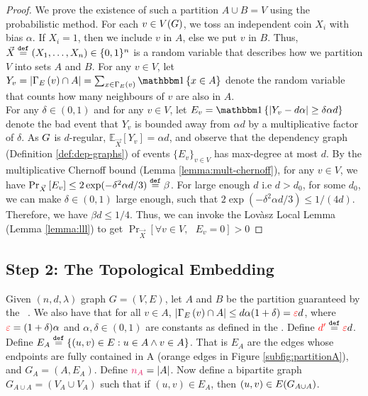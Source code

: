 \documentclass[11pt]{article}
\newcommand{\EnDeeLambda}{(n, d, \lambda)}
\newcommand{\na}{\textcolor{razzmatazz}{n_A}}
\newcommand{\BipartiteG}{G_{A \cup A}}
\newcommand{\EdgesShort}{E}
\newcommand{\Mean}[2]{\mathbb{E}_{#1}\left[#2\right]}
\newcommand{\PProb}[2]{\Pr_{#2}\left[#1 \right]}
\newcommand{\dApproxLower}{\textcolor{red}{d'}}
\begin{document}
\begin{proof}We prove the existence of such a partition $A \cup B = V$ using the probabilistic method.
For each $v \in V(G)$, we toss an independent coin $X_i$ with bias $\alpha$.
If $X_i = 1$, then we include $v$ in $A$, else we put $v$ in $B$.
Thus, $\vec{X} \text{}\overset{\mathtt{def}}{=} (X_1, \dots, X_n) \in \{0,1\}^n$ is a random variable that describes how we partition $V$ into sets $A$ and $B$.
For any $v \in V$, let $Y_v = |\Neighbourhood{\EdgesShort}{v} \cap A| = \sum_{x \in \Neighbourhood{E}{v}} \Indicator{x \in A}$ denote the random variable that counts how many neighbours of $v$ are also in $A$.\\
For any $\delta \in (0,1)$ and for any $v \in V$, let $E_v = \Indicator{|Y_v - d\alpha | \geq \delta \alpha d}$ denote the bad event that $Y_v$ is bounded away from $\alpha d$ by a multiplicative factor of $\delta$.
As $G$ is $d$-regular, $\Mean{\vec{X}}{Y_v} = \alpha d$, and observe that the dependency graph (Definition \ref{def:dep-graphs}) of events $\{ E_v \}_{v \in V}$ has max-degree at most $d$.
By the multiplicative Chernoff bound (Lemma \ref{lemma:mult-chernoff}), for any $v \in V$, we have $\PProb{E_v}{\vec{X}} \leq 2\exp(-\delta^2\alpha d/3) \Def \beta$.
For large enough $d$ i.e $d > d_0$, for some $d_0$, we can make $\delta \in (0,1)$ large enough, such that $2\exp(-\delta^2\alpha d/3) \leq 1/(4d)$. Therefore, we have $\beta d \leq 1/4$.
Thus, we can invoke the Lov\`asz Local Lemma (Lemma \ref{lemma:lll}) to get $\PProb{\forall v \in V, \text{ } E_v = 0}{\vec{X}} > 0$

\end{proof}



\subsection{Step 2: The Topological Embedding}

Given $\EnDeeLambda$ graph $G=(V,E)$, let $A$ and $B$ be the partition guaranteed by the \ .
We also have that for all $v \in A$,  $|\Neighbourhood{\EdgesShort}{v} \cap A| \leq d \alpha(1+\delta) = \Eps d$, where $\textcolor{red}{\varepsilon} = (1+ \delta)\alpha$ and $\alpha, \delta \in (0,1)$ are constants as defined in the .
Define $\dApproxLower \Def \Eps d$.
Define $E_A \text{}\overset{\mathtt{def}}{=} \{ (u,v) \in E : u \in A \land v \in A\}$. 
That is $E_A$ are the edges whose endpoints are fully contained in A (orange edges in Figure \ref{subfig:partitionA}), and $G_A = (A, E_A)$. 
Define $ \na = |A|$.
Now define a bipartite graph $\BipartiteG = (V_A \cup V_A)$ such that if $(u,v) \in E_A$, then $(u,v) \in \Edges{\BipartiteG}$.
\end{document}

